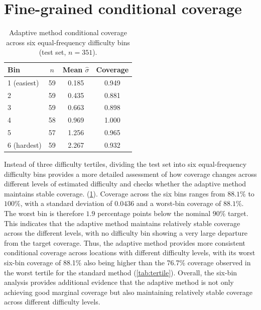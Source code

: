 \documentclass[11pt,a4paper]{report}
\begin{document}
\section{Fine-grained conditional coverage}
\begin{table}[H]
\centering
\caption{Adaptive method conditional coverage across six equal-frequency difficulty bins (test set, $n=351$).}
\label{tab:sixbin}
\begin{tabular}{lccc}
\toprule
Bin & $n$ & Mean $\hat\sigma$ & Coverage \\
\midrule
1 (easiest) & 59 & 0.185 & 0.949 \\
2 & 59 & 0.435 & 0.881 \\
3 & 59 & 0.663 & 0.898 \\
4 & 58 & 0.969 & 1.000 \\
5 & 57 & 1.256 & 0.965 \\
6 (hardest) & 59 & 2.267 & 0.932 \\
\bottomrule
\end{tabular}
\end{table}
Instead of three difficulty tertiles, dividing the test set into six equal-frequency difficulty bins provides a more detailed assessment of how coverage changes across different levels of estimated difficulty and checks whether the adaptive method maintains stable coverage.  (\cref{tab:sixbin}). Coverage across the six bins ranges from $88.1\%$ to $100\%$, with a standard deviation of $0.0436$ and a worst-bin coverage of $88.1\%$. The worst bin is therefore $1.9$ percentage points below the nominal $90\%$ target. This indicates that the adaptive method maintains relatively stable coverage across the different levels, with no difficulty bin showing a very large departure from the target coverage. Thus, the adaptive method provides more consistent conditional coverage across locations with different difficulty levels, with its worst six-bin coverage of 88.1\% also being higher than the 76.7\% coverage observed in the worst tertile for the standard method (\cref{tab:tertile}). Overall, the six-bin analysis provides additional evidence that the adaptive method is not only achieving good marginal coverage but also maintaining relatively stable coverage across different difficulty levels.
\end{document}

